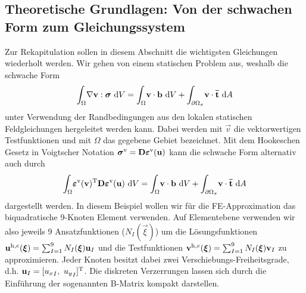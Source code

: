 \documentclass[12pt,bibstyle=none,pagenumberinfooter]{ifmdocument}
\begin{document}
\subsection{Theoretische Grundlagen: Von der schwachen Form zum Gleichungssystem}
Zur Rekapitulation sollen in diesem Abschnitt die wichtigsten Gleichungen wiederholt werden. Wir gehen von einem statischen Problem aus, weshalb die schwache Form 
\begin{gather*}
	\int_{\Omega}\!\nabla\mbox{\boldmath $\mathrm{v}$}:\mbox{\boldmath $\mathrm{\sigma}$}\, \,\mathrm{d} V = \int_{\Omega}\!\mbox{\boldmath $\mathrm{v}$}\cdot\mbox{\boldmath $\mathrm{b}$}\, \,\mathrm{d} V + \int_{\partial\Omega_\sigma}\!\mbox{\boldmath $\mathrm{v}$}\cdot \mbox{\boldmath $\mathrm{\bar{t}}$}\, \,\mathrm{d} A
\end{gather*}
unter Verwendung der Randbedingungen aus den lokalen statischen Feldgleichungen hergeleitet werden kann. Dabei werden mit $\vec{v}$ die vektorwertigen Testfunktionen und mit $\Omega$ das gegebene Gebiet bezeichnet. Mit dem Hookeschen Gesetz in Voigtscher Notation $\mbox{\boldmath $\mathrm{\sigma}$}^{\mathrm{v}} = \mbox{\boldmath $\mathrm{D}$}\mbox{\boldmath $\mathrm{\varepsilon}$}^{\mathrm{v}}(\mbox{\boldmath $\mathrm{u}$})$ kann die schwache Form alternativ auch durch
\begin{gather*}
	\int_{\Omega}\!\mbox{\boldmath $\mathrm{\varepsilon}$}^{\mathrm{v}}(\mbox{\boldmath $\mathrm{v}$})^{\mathrm{T}}\mbox{\boldmath $\mathrm{D}$}\mbox{\boldmath $\mathrm{\varepsilon}$}^{\mathrm{v}}(\mbox{\boldmath $\mathrm{u}$})\, \,\mathrm{d} V = \int_{\Omega}\!\mbox{\boldmath $\mathrm{v}$}\cdot\mbox{\boldmath $\mathrm{b}$}\, \,\mathrm{d} V + \int_{\partial\Omega_\sigma}\!\mbox{\boldmath $\mathrm{v}$}\cdot \mbox{\boldmath $\mathrm{\bar{t}}$}\, \,\mathrm{d} A
\end{gather*}
dargestellt werden.
In diesem Beispiel wollen wir f\"ur die FE-Approximation das biquadratische 9-Knoten Element verwenden. Auf Elementebene verwenden wir also jeweils 9 Ansatzfunktionen ($N_I(\vec{\xi})$) um die L\"osungsfunktionen $\mbox{\boldmath $\mathrm{u}$}^{\mathrm{h},e}(\mbox{\boldmath $\mathrm{\xi}$}) = \sum_{I=1}^{9}N_I(\mbox{\boldmath $\mathrm{\xi}$})\mbox{\boldmath $\mathrm{u}$}_I$ und die Testfunktionen $\mbox{\boldmath $\mathrm{v}$}^{\mathrm{h},e}(\mbox{\boldmath $\mathrm{\xi}$}) = \sum_{I=1}^{9}N_I(\mbox{\boldmath $\mathrm{\xi}$})\mbox{\boldmath $\mathrm{v}$}_I$ zu approximieren. Jeder Knoten besitzt dabei zwei Verschiebungs-Freiheitsgrade, d.h. $\mbox{\boldmath $\mathrm{u}$}_I = [{u_x}_I,~{u_y}_I]^{\mathrm{T}}$.
Die diskreten Verzerrungen lassen sich durch die Einführung der sogenannten B-Matrix kompakt darstellen.
\end{document}

